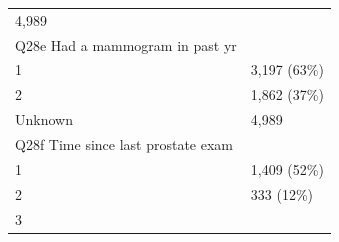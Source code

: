\documentclass[]{article}
\begin{document}
\begin{longtable}[]{@{}ll@{}}
\begin{minipage}[t]{0.23\columnwidth}
4,989\strut
\end{minipage}\tabularnewline
\begin{minipage}[t]{0.71\columnwidth}\raggedright
Q28e Had a mammogram in past yr\strut
\end{minipage} & \begin{minipage}[t]{0.23\columnwidth}\raggedright
\strut
\end{minipage}\tabularnewline
\begin{minipage}[t]{0.71\columnwidth}\raggedright
1\strut
\end{minipage} & \begin{minipage}[t]{0.23\columnwidth}\raggedright
3,197 (63\%)\strut
\end{minipage}\tabularnewline
\begin{minipage}[t]{0.71\columnwidth}\raggedright
2\strut
\end{minipage} & \begin{minipage}[t]{0.23\columnwidth}\raggedright
1,862 (37\%)\strut
\end{minipage}\tabularnewline
\begin{minipage}[t]{0.71\columnwidth}\raggedright
Unknown\strut
\end{minipage} & \begin{minipage}[t]{0.23\columnwidth}\raggedright
4,989\strut
\end{minipage}\tabularnewline
\begin{minipage}[t]{0.71\columnwidth}\raggedright
Q28f Time since last prostate exam\strut
\end{minipage} & \begin{minipage}[t]{0.23\columnwidth}\raggedright
\strut
\end{minipage}\tabularnewline
\begin{minipage}[t]{0.71\columnwidth}\raggedright
1\strut
\end{minipage} & \begin{minipage}[t]{0.23\columnwidth}\raggedright
1,409 (52\%)\strut
\end{minipage}\tabularnewline
\begin{minipage}[t]{0.71\columnwidth}\raggedright
2\strut
\end{minipage} & \begin{minipage}[t]{0.23\columnwidth}\raggedright
333 (12\%)\strut
\end{minipage}\tabularnewline
\begin{minipage}[t]{0.71\columnwidth}\raggedright
3\strut
\end{minipage} & \begin{minipage}[t]{0.23\columnwidth}\raggedright

\end{minipage}
\end{longtable}
\end{document}
